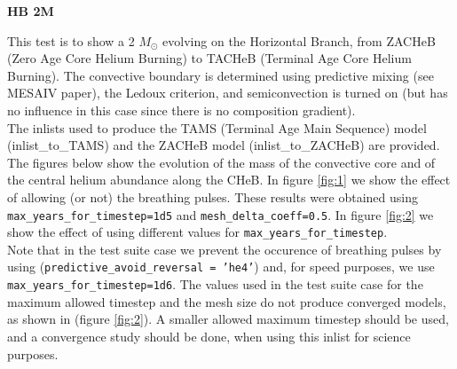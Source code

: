 \documentclass{article}
\begin{document}
	
	\begin{center}
	  \begin{Large}
	    \textbf{HB 2M}\\
	  \end{Large}
	\end{center}

        This test is to show a 2 $M_\odot$ evolving on the Horizontal Branch, from ZACHeB (Zero Age Core Helium Burning) to TACHeB (Terminal Age Core Helium Burning). The convective boundary is determined using predictive mixing (see MESAIV paper), the Ledoux criterion, and semiconvection is turned on (but has no influence in this case since there is no composition gradient).\\
        
The inlists used to produce the TAMS (Terminal Age Main Sequence) model (inlist\_to\_TAMS) and the ZACHeB model (inlist\_to\_ZACHeB) are provided.\\

       The figures below show the evolution of the mass of the convective core and of the central helium abundance along the CHeB. In  figure \ref{fig:1} we show the effect of allowing (or not) the breathing pulses. These results were obtained using \texttt{max\_years\_for\_timestep=1d5} and \texttt{mesh\_delta\_coeff=0.5}.  In figure \ref{fig:2} we show the effect of using different values for \texttt{max\_years\_for\_timestep}. \\
 
 Note that in the test suite case we prevent the occurence of breathing pulses by using (\texttt{predictive\_avoid\_reversal = 'he4'}) and, for speed purposes, we use \texttt{max\_years\_for\_timestep=1d6}. The values used in the test suite case for the maximum allowed timestep and the mesh size do not produce converged models, as shown in (figure \ref{fig:2}). A smaller allowed maximum timestep should be used, and a convergence study should be done, when using this inlist for science purposes.\\

        
 
\end{document}

